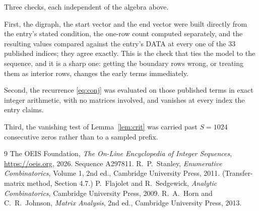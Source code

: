 \documentclass[11pt,a4paper]{article}
\theoremstyle{plain}
\theoremstyle{definition}
\begin{document}
Three checks, each independent of the algebra above.

First, the digraph, the start vector and the end vector were built directly from the
entry's stated condition, the one-row count computed separately, and the resulting values
compared against the entry's DATA at every one of the $33$ published indices; they
agree exactly. This is the check that ties the model to the sequence, and it is a sharp one:
getting the boundary rows wrong, or treating them as interior rows, changes the early terms
immediately.

Second, the recurrence \eqref{eq:conj} was evaluated on those published terms in exact
integer arithmetic, with no matrices involved, and vanishes at every index the entry claims.

Third, the vanishing test of Lemma~\ref{lem:crit} was carried past $S=1024$ consecutive
zeros rather than to a sampled prefix.

\begin{thebibliography}{9}
 The OEIS Foundation, \emph{The On-Line Encyclopedia of Integer
Sequences}, \url{https://oeis.org}, 2026. Sequence A297811.
 R.~P.~Stanley, \emph{Enumerative Combinatorics}, Volume 1, 2nd ed.,
Cambridge University Press, 2011. (Transfer-matrix method, Section 4.7.)
 P.~Flajolet and R.~Sedgewick, \emph{Analytic Combinatorics}, Cambridge
University Press, 2009.
 R.~A.~Horn and C.~R.~Johnson, \emph{Matrix Analysis}, 2nd ed., Cambridge
University Press, 2013.
\end{thebibliography}
\end{document}
